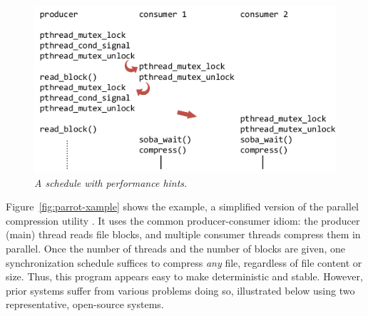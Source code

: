 \begin{figure}[t]
\centering
\includegraphics[width=\columnwidth]{parrot/figures/parrot_schedule}
\vspace{-.2in}
\caption{{\em A \parrot schedule with performance
    hints.}}\label{fig:parrot-schedule}
\vspace{-.05in}
\end{figure}


Figure~\ref{fig:parrot-xample} shows the example, a simplified version of the parallel
compression utility \pbzip\cite{pbzip2}.  It uses the common producer-consumer idiom:
the producer (main) thread reads file blocks, and multiple consumer
threads compress them in parallel.  Once the number of threads and the
number of blocks are given, one synchronization schedule suffices to
compress \emph{any} file, regardless of file content or size.  Thus, this program appears
easy to make deterministic and stable.  However, prior systems suffer from
various problems doing so, illustrated below using
two representative, open-source systems.


